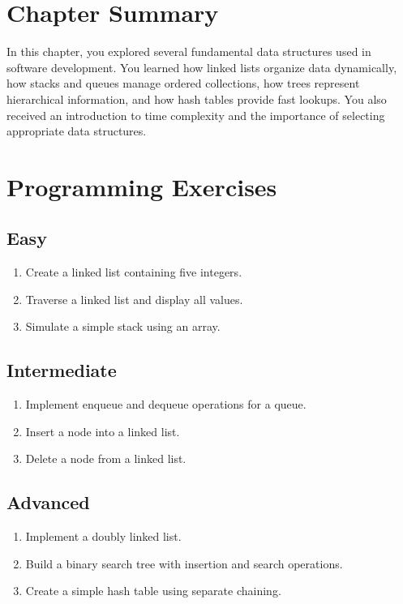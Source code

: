 \documentclass[12pt,openany]{book}
\begin{document}
\section{Chapter Summary}

In this chapter, you explored several fundamental data structures used in software development. You learned how linked lists organize data dynamically, how stacks and queues manage ordered collections, how trees represent hierarchical information, and how hash tables provide fast lookups. You also received an introduction to time complexity and the importance of selecting appropriate data structures.

\section{Programming Exercises}

\subsection*{Easy}

\begin{enumerate}
    \item Create a linked list containing five integers.
    \item Traverse a linked list and display all values.
    \item Simulate a simple stack using an array.
\end{enumerate}

\subsection*{Intermediate}

\begin{enumerate}
    \item Implement enqueue and dequeue operations for a queue.
    \item Insert a node into a linked list.
    \item Delete a node from a linked list.
\end{enumerate}

\subsection*{Advanced}

\begin{enumerate}
    \item Implement a doubly linked list.
    \item Build a binary search tree with insertion and search operations.
    \item Create a simple hash table using separate chaining.
\end{enumerate}
\end{document}
